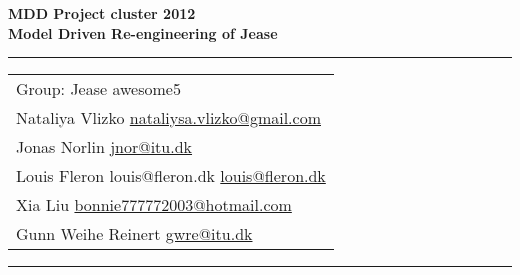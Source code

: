

\thispagestyle{empty} %

\begin{flushleft}
    \LARGE\bfseries MDD Project cluster 2012\\
    Model Driven Re-engineering of Jease\\[2cm]
\end{flushleft}

\rule{\textwidth}{1pt}
\vspace{2pt}

\begin{flushright}
    \Huge
    \begin{tabular}{@{}l} %
        Group: Jease awesome5\\
        \Large Nataliya Vlizko
            \href{mailto:nataliya.vlizko@gmail.com}{nataliysa.vlizko@gmail.com}\\
        \Large Jonas Norlin
            \href{mailto:jnor@itu.dk}{jnor@itu.dk}\\
        \Large Louis Fleron louis@fleron.dk
            \href{mailto:louis@fleron.dk}{louis@fleron.dk}\\
        \Large Xia Liu
            \href{mailto:bonnie777772003@hotmail.com}{bonnie777772003@hotmail.com}\\
        \Large Gunn Weihe Reinert
            \href{mailto:gwre@itu.dk}{gwre@itu.dk}\\
        [6pt]
    \end{tabular}
\end{flushright}

\rule{\textwidth}{1pt}
\vfill
